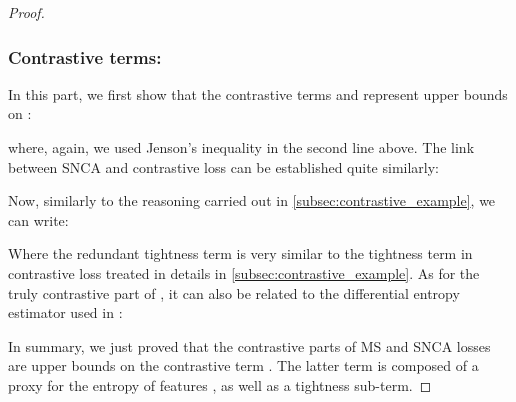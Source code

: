 \documentclass[runningheads]{llncs}
\begin{document}
\begin{proof}
            \subsubsection{Contrastive terms:} In this part, we first show that the contrastive terms  and  represent upper bounds on :
            
            where, again, we used Jenson's inequality in the second line above. The link between SNCA and contrastive loss can be established quite similarly:
            
            
            Now, similarly to the reasoning carried out in \autoref{subsec:contrastive_example}, we can write:
            
            Where the redundant tightness term is very similar to the tightness term in contrastive loss  treated in details in \autoref{subsec:contrastive_example}. As for the truly contrastive part of , it can also be related to the differential entropy estimator used in \cite{wang2011information}:
            
            In summary, we just proved that the contrastive parts of MS and SNCA losses are upper bounds on the contrastive term . The latter term is composed of a proxy for the entropy of features , as well 
            as a tightness sub-term.
        \end{proof}
    
    
\end{document}

